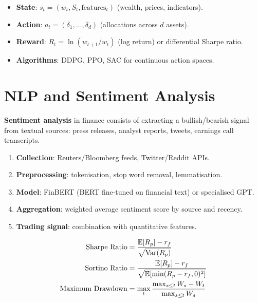 \begin{proposition}
\begin{itemize}
    \item \textbf{State}: $s_t = (w_t, S_t, \text{features}_t)$ (wealth,
    prices, indicators).
    \item \textbf{Action}: $a_t = (\delta_1, \ldots, \delta_d)$ (allocations
    across $d$ assets).
    \item \textbf{Reward}: $R_t = \ln(w_{t+1}/w_t)$ (log return) or
    differential Sharpe ratio.
    \item \textbf{Algorithms}: DDPG, PPO, SAC for continuous action spaces.
\end{itemize}
\end{proposition}

\section{NLP and Sentiment Analysis}

\begin{definition}
\textbf{Sentiment analysis} in finance consists of extracting a
bullish/bearish signal from textual sources: press releases, analyst reports,
tweets, earnings call transcripts.
\end{definition}

\begin{proposition}
\begin{enumerate}
    \item \textbf{Collection}: Reuters/Bloomberg feeds, Twitter/Reddit APIs.
    \item \textbf{Preprocessing}: tokenisation, stop word removal,
    lemmatisation.
    \item \textbf{Model}: FinBERT (BERT fine-tuned on financial text) or
    specialised GPT.
    \item \textbf{Aggregation}: weighted average sentiment score by source
    and recency.
    \item \textbf{Trading signal}: combination with quantitative features.
\end{enumerate}
\end{proposition}

\begin{keyformulas}[title=\textbf{ML Strategy Performance Metrics}]
\begin{align*}
    \text{Sharpe Ratio} &= \frac{\mathbb{E}[R_p] - r_f}{\sqrt{\mathrm{Var}(R_p)}} \\
    \text{Sortino Ratio} &= \frac{\mathbb{E}[R_p] - r_f}{\sqrt{\mathbb{E}[\min(R_p - r_f, 0)^2]}} \\
    \text{Maximum Drawdown} &= \max_{t}\frac{\max_{s \leq t} W_s - W_t}{\max_{s \leq t} W_s}
\end{align*}
\end{keyformulas}

